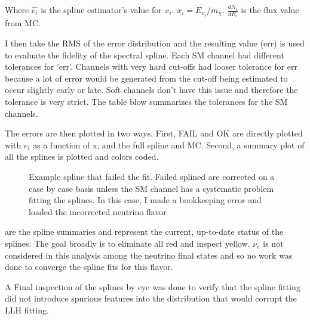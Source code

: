 Where $ \hat{e_i} $ is the spline estimator's value for $x_i$. $ x_i = E_{\nu_i} / m_\chi $. $ \frac{dN_i}{dE_i} $ is the flux value from MC.
\MSEspline

I then take the RMS of the error distribution and the resulting value (err) is used to evaluate the fidelity of the spectral spline.
Each SM channel had different tolerances for 'err'. Channels with very hard cut-offs had looser tolerance for err because a lot of error would be generated from the cut-off being estimated to occur slightly early or late.
Soft channels don't have this issue and therefore the tolerance is very strict.
The table blow summarizes the tolerances for the SM channels.


The errors are then plotted in two ways.
First, FAIL and OK are directly plotted with $e_i$ as a function of x, and the full spline and MC.
Second, a summary plot of all the splines is plotted and colors coded.

\begin{figure}
    \caption{Example spline that failed the fit. Failed splined are corrected on a case by case basis unless the SM channel has a systematic problem fitting the splines. In this case, I made a bookkeeping error and loaded the incorrected neutrino flavor}
    \label{fig:icDM_failedspline}
\end{figure}

 are the spline summaries and represent the current, up-to-date status of the splines.
The goal broadly is to eliminate all red and inspect yellow. $ \nu_e $ is not considered in this analysis among the neutrino final states and so no work was done to converge the spline fits for this flavor.

A Final inspection of the splines by eye was done to verify that the spline fitting did not introduce spurious features into the distribution that would corrupt the LLH fitting.

